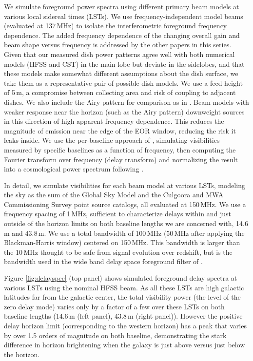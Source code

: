 \documentclass{emulateapj}
\begin{document}
We simulate foreground power spectra using different primary beam models at various local sidereal times (LSTs). We use frequency-independent model beams (evaluated at 137\,MHz) to isolate the interferometric foreground frequency dependence. The added frequency dependence of the changing overall gain and beam shape versus frequency is addressed by the other papers in this series. Given that our measured dish power patterns agree well with both numerical models (HFSS and CST) in the main lobe but deviate in the sidelobes, and that these models make somewhat different assumptions about the dish surface, we take them as a representative pair of possible dish models. We use a feed height of 5\,m, a compromise between collecting area and risk of coupling to adjacent dishes. We also include the Airy pattern for comparison as in \citet{nithya15}. Beam models with weaker response near the horizon (such as the Airy pattern) downweight sources in this direction of high apparent frequency dependence. This reduces the magnitude of emission near the edge of the EOR window, reducing the risk it leaks inside. We use the per-baseline approach of \citet{parsons12a,parsons12b}, simulating visibilities measured by specific baselines as a function of frequency, then computing the Fourier transform over frequency (delay transform) and normalizing the result into a cosmological power spectrum following \citet{nithya15}. 

In detail, we simulate visibilities for each beam model at various LSTs, modeling the sky as the sum of the Global Sky Model \citep{gsm} and the Culgoora \citep{Slee1995} and MWA Commissioning Survey \citep{MWACS} point source catalogs, all evaluated at 150\,MHz. We use a frequency spacing of 1\,MHz, sufficient to characterize delays within and just outside of the horizon limits on both baseline lengths we are concerned with, 14.6\,m and 43.8\,m. We use a total bandwidth of 100\,MHz (50\,MHz after applying the Blackman-Harris window) centered on 150\,MHz. This bandwidth is larger than the 10\,MHz thought to be safe from signal evolution over redshift, but is the bandwidth used in the wide band delay space foreground filter of \citet{paper32,ali2015}.

Figure \ref{fig:delayspec} (top panel) shows simulated foreground delay spectra at various LSTs using the nominal HFSS beam. As all these LSTs are high galactic latitudes far from the galactic center, the total visibility power (the level of the zero delay mode) varies only by a factor of a few over these LSTs on both baseline lengths (14.6\,m (left panel), 43.8\,m (right panel)). However the positive delay horizon limit (corresponding to the western horizon) has a peak that varies by over 1.5 orders of magnitude on both baseline, demonstrating the stark difference in horizon brightening when the galaxy is just above versus just below the horizon. 
\end{document}

